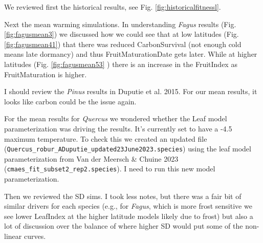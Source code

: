 \documentclass[11pt,letter]{article}
\begin{document}
We reviewed first the historical results, see Fig. \ref{fig:historicalfitnessl}. 

Next the mean warming simulations. In understanding \emph{Fagus} results (Fig. \ref{fig:fagusmean3}) we discussed how we could see that at low latitudes (Fig. \ref{fig:fagusmean41}) that there was reduced CarbonSurvival (not enough cold means late dormancy) and thus FruitMaturationDate gets later. While at higher latitudes (Fig. \ref{fig:fagusmean53} ) there is an increase in the FruitIndex as FruitMaturation is higher. 

I should review the \emph{Pinus} results in Duputie et al. 2015. For our mean results, it looks like carbon could be the issue again. 

For the mean results for \emph{Quercus} we wondered whether the Leaf model parameterization was driving the results. It's currently set to have a -4.5 maximum temperature. To check this we created an updated file (\verb|Quercus_robur_ADuputie_updated23June2023.species|) using the leaf model parameterization from Van der Meersch \& Chuine 2023 (\verb|cmaes_fit_subset2_rep2.species|). I need to run this new model parameterization.

Then we reviewed the SD sims. I took less notes, but there was a fair bit of similar drivers for each species (e.g., for \emph{Fagus}, which is more frost sensitive we see lower LeafIndex at the higher latitude models likely due to frost) but also a lot of discussion over the balance of where higher SD would put some of the non-linear curves. 
\end{document}
